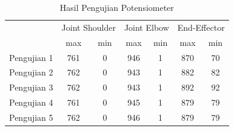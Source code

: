 \begin{table}[H]
	\centering
	\caption{Hasil Pengujian Potensiometer}
	\label{tbl.potensiometer}
	\begin{tabular}{|c|c|c|c|c|c|c|}
		\hline
		\rowcolor[HTML]{9B9B9B} 
		\cellcolor[HTML]{9B9B9B}                            & \multicolumn{2}{c|}{\cellcolor[HTML]{9B9B9B}Joint Shoulder} & \multicolumn{2}{c|}{\cellcolor[HTML]{9B9B9B}Joint Elbow} & \multicolumn{2}{c|}{\cellcolor[HTML]{9B9B9B}End-Effector} \\ \cline{2-7} 
		\rowcolor[HTML]{9B9B9B} 
		\multirow{-2}{*}{\cellcolor[HTML]{9B9B9B}Pengujian} & max                          & min                          & max                         & min                        & max                         & min                         \\ \hline
		Pengujian 1                                         & 761                          & 0                            & 946                         & 1                          & 870                         & 70                          \\ \hline
		Pengujian 2                                         & 762                          & 0                            & 943                         & 1                          & 882                         & 82                          \\ \hline
		Pengujian 3                                         & 762                          & 0                            & 943                         & 1                          & 892                         & 92                          \\ \hline
		Pengujian 4                                         & 761                          & 0                            & 945                         & 1                          & 879                         & 79                          \\ \hline
		Pengujian 5                                         & 762                          & 0                            & 946                         & 1                          & 879                         & 79                          \\ \hline
	\end{tabular}
\end{table} 

